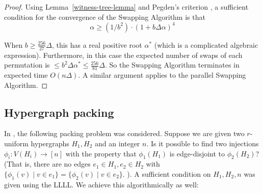 \begin{proof}
Using Lemma~\ref{witness-tree-lemma} and Pegden's criterion \cite{pegden}, a sufficient condition for the convergence of the Swapping Algorithm is that
$$
\alpha \geq (1/b^2) \cdot (1 + b \Delta \alpha)^4
$$

When $b \geq \frac{256}{27} \Delta$, this has a real positive root $\alpha^*$ (which is a complicated algebraic expression). Furthermore,  in this case the expected number of swaps of each permutation is $\leq b^2 \Delta \alpha^* \leq \frac{256}{81} \Delta$. So the Swapping Algorithm terminates in expected time $O(n \Delta)$. A similar argument applies to the parallel Swapping Algorithm.
\end{proof}

\subsection{Hypergraph packing}
In \cite{random-inj}, the following packing problem was considered. Suppose we are given two $r$-uniform hypergraphs $H_1, H_2$ and an integer $n$. Is it possible to find two injections $\phi_i: V(H_i) \rightarrow [n]$ with the property that $\phi_1(H_1)$ is edge-disjoint to $\phi_2(H_2)$? (That is, there are no edges $e_1 \in H_1, e_2 \in H_2$ with $\{ \phi_1(v) \mid v \in e_1 \} = \{ \phi_2(v) \mid v \in e_2 \}$. ). A sufficient condition on $H_1, H_2, n$ was given using the LLLL. We achieve this algorithmically as well:

